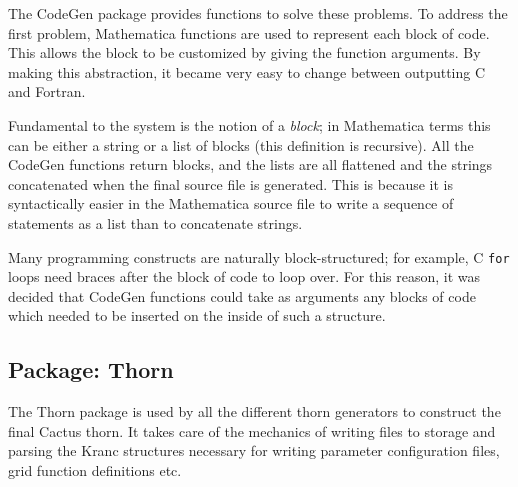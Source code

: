 \documentclass{report}
\begin{document}
The CodeGen package provides functions to solve these problems.  To
address the first problem, Mathematica functions are used to represent
each block of code.  This allows the block to be customized by giving
the function arguments.  By making this abstraction, it became very
easy to change between outputting C and Fortran.

Fundamental to the system is the notion of a {\em block}; in
Mathematica terms this can be either a string or a list of blocks
(this definition is recursive).  All the CodeGen functions return
blocks, and the lists are all flattened and the strings concatenated
when the final source file is generated.  This is because it is
syntactically easier in the Mathematica source file to write a
sequence of statements as a list than to concatenate strings.

Many programming constructs are naturally block-structured; for
example, C {\tt for} loops need braces after the block of code to loop
over.  For this reason, it was decided that CodeGen functions could
take as arguments any blocks of code which needed to be inserted on
the inside of such a structure.

\subsection{Package: Thorn}

The Thorn package is used by all the different thorn generators to
construct the final Cactus thorn.  It takes care of the mechanics of
writing files to storage and parsing the Kranc structures necessary
for writing parameter configuration files, grid function definitions
etc.
\end{document}
